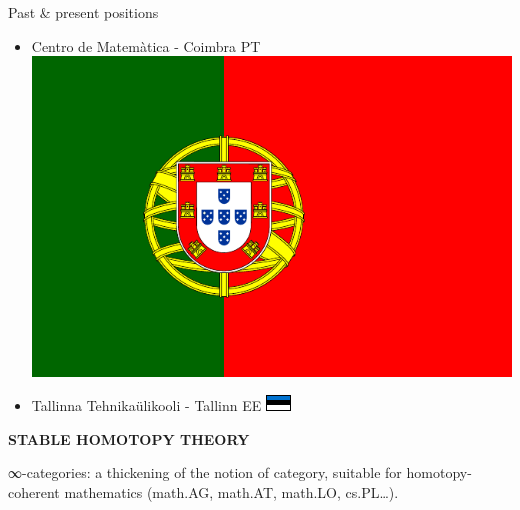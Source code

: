 \documentclass[handout]{beamer}
\def\lnk#1{\href{#1}{\faFilePdfO}}
\begin{document}
\begin{frame}{Past \& present positions}
\begin{itemize}
    \item<+-> Centro de Matemàtica - Coimbra PT \includegraphics[scale=.04]{por.pdf}

    \item<+-> Tallinna Tehnikaülikooli - Tallinn EE \includegraphics{est.pdf}

  \end{itemize}
\end{frame}
%
%
%
%
%
\begin{frame}
  \Huge\centering \bfseries STABLE HOMOTOPY THEORY
\end{frame}
%
\begin{frame}
  \alert{∞-categories}: a thickening of the notion of category, suitable for homotopy-coherent mathematics (math.AG, math.AT, math.LO, cs.PL\dots).



\end{frame}
\end{document}
